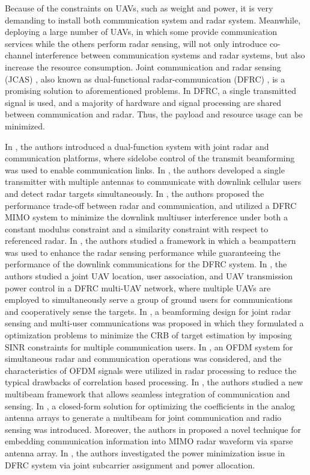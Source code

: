 \documentclass[journal,twocolumn]{IEEEtran}
\begin{document}
Because of the constraints on UAVs, such as weight and power, it is very demanding to install both communication system and radar system. Meanwhile, deploying a large number of UAVs, in which some provide communication services while the others perform radar sensing, will not only introduce co-channel interference between communication systems and radar systems, but also increase the resource consumption. Joint communication and radar sensing (JCAS) \cite{liu2021integrated}, also known as dual-functional radar-communication (DFRC) \cite{hassanien2015dual}, is a promising solution to aforementioned problems. In DFRC, a single transmitted signal is used, and a majority of hardware and signal processing are shared between communication and radar. Thus, the payload and resource usage can be minimized.

In \cite{hassanien2015dual}, the authors introduced a dual-function system with joint radar and communication platforms, where sidelobe control of the transmit beamforming was used to enable communication links. In \cite{liu2018toward}, the authors developed a single transmitter with multiple antennas to communicate with downlink cellular users and detect radar targets simultaneously. In \cite{liu2018dual}, the authors proposed the performance trade-off between radar and communication, and utilized a DFRC MIMO system to minimize the downlink multiuser interference under both a constant modulus constraint and a similarity constraint with respect to referenced radar. In \cite{liu2018mu}, the authors studied a framework in which a beampattern was used to enhance the radar sensing performance while guaranteeing the performance of the downlink communications for the DFRC system. In \cite{wang2020constrained}, the authors studied a joint UAV location, user association, and UAV transmission power control in a DFRC multi-UAV network, where multiple UAVs are employed to simultaneously serve a group of ground users for communications and cooperatively sense the targets. In \cite{liu2021cramr}, a beamforming design for joint radar sensing and multi-user communications was proposed in which they
formulated a optimization problems to minimize the CRB of target estimation by imposing SINR constraints for multiple communication users. In \cite{sturm2009ofdm}, an OFDM system for simultaneous radar and communication operations was considered, and the characteristics of OFDM signals were utilized in radar processing to reduce the typical drawbacks of correlation based processing. In \cite{zhang2018multibeam}, the authors studied a new multibeam framework that allows seamless integration of communication and sensing. In \cite{luo2019constrained}, a closed-form solution for optimizing the coefficients in the analog antenna arrays to generate a multibeam for joint communication and radio sensing was introduced. Moreover, the authors in \cite{wang2018dual} proposed a novel technique for embedding communication
information into MIMO radar waveform via sparse antenna array. In \cite{shi2019joint}, the authors investigated the power minimization issue in DFRC system via joint subcarrier assignment and power allocation.
\end{document}

